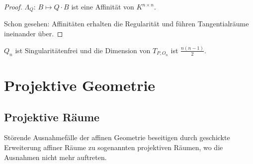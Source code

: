 \documentclass[parskip,a4paper,twoside,DIV15,BCOR12mm]{scrbook}
\begin{document}
\begin{proof}
\(\Lambda_{Q}:\,B\mapsto Q\cdot B\) ist eine Affinität von \(K^{n\times n}\).

Schon gesehen: Affinitäten erhalten die Regularität und führen 
Tangentialräume ineinander über.
\end{proof}
\begin{corollary}
\(Q_{n}\) ist Singularitätenfrei und die Dimension von \(T_{P,O_{n}}\) ist
\(\frac{n(n-1)}{2}\).
\end{corollary}

\chapter{Projektive Geometrie}
\section{Projektive Räume}
\begin{zweck}
Störende Ausnahmefälle der affinen Geometrie beseitigen durch geschickte 
Erweiterung affiner Räume zu sogenannten projektiven Räumen, wo die
Ausnahmen nicht mehr auftreten.
\end{zweck}
\end{document}
